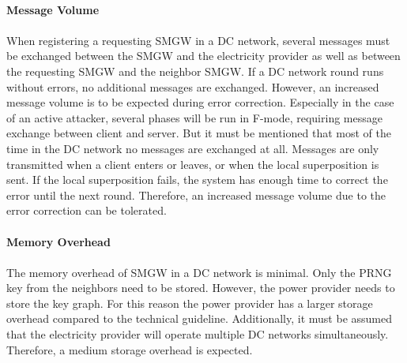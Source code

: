 \\
\textbf{Message Volume}
\\
\\
When registering a requesting SMGW in a DC network, several messages must be exchanged between the SMGW and the electricity provider as well as between the requesting SMGW and the neighbor SMGW. If a DC network round runs without errors, no additional messages are exchanged.
However, an increased message volume is to be expected during error correction. Especially in the case of an active attacker, several phases will be run in F-mode, requiring message exchange between client and server. But it must be mentioned that most of the time in the DC network no messages are exchanged at all. Messages are only transmitted when a client enters or leaves, or when the local superposition is sent. If the local superposition fails, the system has enough time to correct the error until the next round. Therefore, an increased message volume due to the error correction can be tolerated.\\
\\
\textbf{Memory Overhead}
\\
\\
The memory overhead of SMGW in a DC network is minimal. Only the PRNG key from the neighbors need to be stored. However, the power provider needs to store the key graph. For this reason the power provider has a larger storage overhead compared to the technical guideline. Additionally, it must be assumed that the electricity provider will operate multiple DC networks simultaneously. Therefore, a medium storage overhead is expected.

